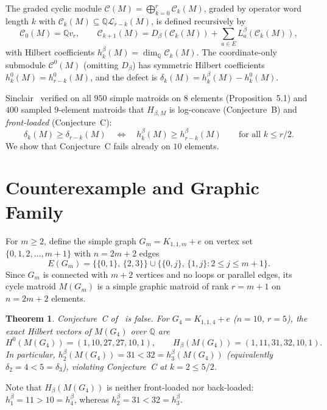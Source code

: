 \documentclass[11pt]{article}
\newtheorem{theorem}{Theorem}[section]
\theoremstyle{remark}
\begin{document}
The graded cyclic module $\mathcal{C}(M) = \bigoplus_{k=0}^r \mathcal{C}_k(M)$, graded by operator word length $k$ with $\mathcal{C}_k(M) \subseteq \mathbb{Q}\mathcal{L}_{r-k}(M)$, is defined recursively by
\[
\mathcal{C}_0(M) = \mathbb{Q} v_r, \qquad \mathcal{C}_{k+1}(M) = D_\beta(\mathcal{C}_k(M)) + \sum_{a \in E} L_a^\beta(\mathcal{C}_k(M)),
\]
with Hilbert coefficients $h_k^\beta(M) = \dim_{\mathbb{Q}} \mathcal{C}_k(M)$. The coordinate-only submodule $\mathcal{C}^0(M)$ (omitting $D_\beta$) has symmetric Hilbert coefficients $h_k^0(M) = h_{r-k}^0(M)$, and the defect is $\delta_k(M) = h_k^\beta(M) - h_k^0(M)$.

Sinclair~\cite[Section~1]{Sinclair2026} verified on all $950$ simple matroids on $8$ elements (Proposition~5.1) and $400$ sampled $9$-element matroids that $H_{\beta, M}$ is log-concave (Conjecture~B) and \emph{front-loaded} (Conjecture~C):
\[
\delta_k(M) \ge \delta_{r-k}(M) \quad \Longleftrightarrow \quad h_k^\beta(M) \ge h_{r-k}^\beta(M) \qquad \text{for all } k \le r/2.
\]
We show that Conjecture~C fails already on $10$ elements.

\section{Counterexample and Graphic Family}

For $m \ge 2$, define the simple graph $G_m = K_{1,1,m} + e$ on vertex set $\{0, 1, 2, \dots, m + 1\}$ with $n = 2m + 2$ edges
\[
E(G_m) = \bigl\{\{0, 1\},\, \{2, 3\}\bigr\} \cup \bigl\{\{0, j\},\, \{1, j\} : 2 \le j \le m + 1\bigr\}.
\]
Since $G_m$ is connected with $m + 2$ vertices and no loops or parallel edges, its cycle matroid $M(G_m)$ is a simple graphic matroid of rank $r = m + 1$ on $n = 2m + 2$ elements.

\begin{theorem}\label{thm:counterexample}
Conjecture~C of~\cite{Sinclair2026} is false. For $G_4 = K_{1,1,4} + e$ ($n = 10$, $r = 5$), the exact Hilbert vectors of $M(G_4)$ over $\mathbb{Q}$ are
\[
H^0(M(G_4)) = (1, 10, 27, 27, 10, 1), \qquad H_\beta(M(G_4)) = (1, 11, 31, 32, 10, 1).
\]
In particular, $h_2^\beta(M(G_4)) = 31 < 32 = h_3^\beta(M(G_4))$ (equivalently $\delta_2 = 4 < 5 = \delta_3$), violating Conjecture~C at $k = 2 \le 5/2$.
\end{theorem}

Note that $H_\beta(M(G_4))$ is neither front-loaded nor back-loaded: $h_1^\beta = 11 > 10 = h_4^\beta$, whereas $h_2^\beta = 31 < 32 = h_3^\beta$.
\end{document}
